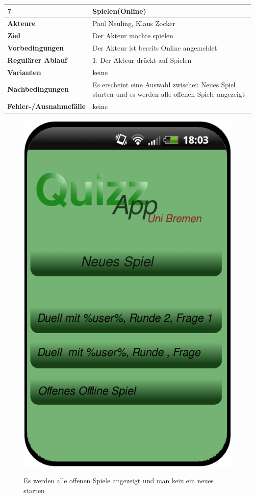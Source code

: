 \documentclass[fontsize=12pt,paper=a4,twoside]{scrartcl}
\begin{document}
\begin{table}
	[H] \label{7} 
	\begin{tabular}
		{|l|p{10cm}|} \hline \textbf{7} & \textbf{Spielen(Online)} \\
		\hline \textbf{Akteure} & Paul Neuling, Klaus Zocker\\
		\hline \textbf{Ziel} & Der Akteur möchte spielen\\
		\hline \textbf{Vorbedingungen} & Der Akteur ist bereits Online angemeldet \\
		\hline \textbf{Regulärer Ablauf} & 1. Der Akteur drückt auf Spielen\\
		\hline \textbf{Varianten} & keine \\
		\hline \textbf{Nachbedingungen} & Es erscheint eine Auswahl zwischen Neues Spiel starten und es werden alle offenen Spiele angezeigt\\
		\hline \textbf{Fehler-/Ausnahmefälle} & keine \\
		\hline 
	\end{tabular}
\end{table}

\begin{figure}
	[H] \caption{Es werden alle offenen Spiele angezeigt und man kein ein neues starten} 
	\includegraphics[width=0.5
	\textwidth]{Bilder/QuizzSpielen.png} \label{pic:Startseite} 
\end{figure}
\end{document}
